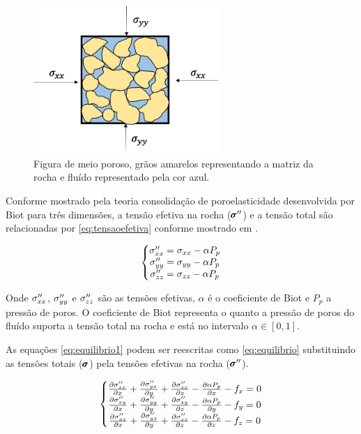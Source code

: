 \begin{figure}[!htbp]
\centering
\includegraphics[width=7cm]{chap01/figs/fluido_rocha_tensoes.png}
\caption{Figura de meio poroso, grãos amarelos representando a matriz da rocha e fluído representado pela cor azul.}
\label{fig:rochaComFluido}
\end{figure}

Conforme mostrado pela teoria consolidação de poroelasticidade desenvolvida por Biot para três dimensões, a tensão efetiva na rocha ($\pmb{\sigma}^{\prime\prime}$) e a tensão total são relacionadas por \eqref{eq:tensaoefetiva} conforme mostrado em \citet{ResGeomec}.


\begin{equation}
\label{eq:tensaoefetiva}
\left\{\begin{matrix}
 \sxx = \stxx - \alpha P_p \\
 \syy = \styy - \alpha P_p \\
 \szz = \stzz - \alpha P_p
\end{matrix}\right.
\end{equation}


Onde $\sigma^{\prime\prime}_{xx}$, $\sigma^{\prime\prime}_{yy}$  e $\sigma^{\prime\prime}_{zz}$ são as tensões efetivas, $\alpha$ é o coeficiente de Biot e $P_p$ a pressão de poros. O coeficiente de Biot representa o quanto a pressão de poros do fluído suporta a tensão total na rocha e está no intervalo $\alpha \in [0,1]$.

As equações \eqref{eq:equilibrio1} podem ser reescritas como \eqref{eq:equilibrio} substituindo as tensões totais ($\pmb{\sigma}$) pela tensões efetivas na rocha ($\pmb{\sigma}^{\prime\prime}$).

\begin{equation}
\label{eq:equilibrio}
\left\{\begin{matrix}
\dx[\sxx]  + \dy[\syx] + \dz[\szx] - \dx[\alpha P_p] - f_x   = 0
\\
\dx[\sxy]  + \dy[\syy] + \dz[\szy] - \dy[\alpha P_p] - f_y   = 0
\\
\dx[\sxz]  + \dy[\syz] + \dz[\szz] - \dz[\alpha P_p] - f_z   = 0
\end{matrix}\right.
\end{equation}


